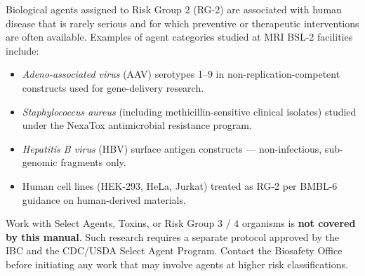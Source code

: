 Biological agents assigned to Risk Group 2 (RG-2) are associated with human disease
that is rarely serious and for which preventive or therapeutic interventions are
often available. Examples of agent categories studied at MRI BSL-2 facilities include:

\begin{itemize}[leftmargin=1.6em, itemsep=1pt]
  \item \textit{Adeno-associated virus} (AAV) serotypes 1--9 in non-replication-competent
        constructs used for gene-delivery research.
  \item \textit{Staphylococcus aureus} (including methicillin-sensitive clinical
        isolates) studied under the NexaTox antimicrobial resistance program.
  \item \textit{Hepatitis B virus} (HBV) surface antigen constructs — non-infectious,
        sub-genomic fragments only.
  \item Human cell lines (HEK-293, HeLa, Jurkat) treated as RG-2 per BMBL-6
        guidance on human-derived materials.
\end{itemize}

\begin{dangerbox}
Work with Select Agents, Toxins, or Risk Group 3 / 4 organisms is \textbf{not
covered by this manual}. Such research requires a separate protocol approved by
the IBC and the CDC/USDA Select Agent Program. Contact the Biosafety Office
before initiating any work that may involve agents at higher risk classifications.
\end{dangerbox}
